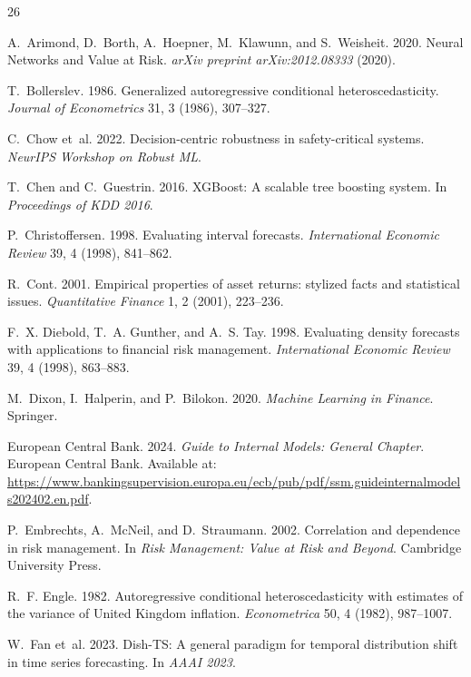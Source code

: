 \documentclass[sigconf]{acmart}
\begin{document}

\begin{thebibliography}{26}

A.~Arimond, D.~Borth, A.~Hoepner, M.~Klawunn, and S.~Weisheit. 2020. Neural Networks and Value at Risk. \textit{arXiv preprint arXiv:2012.08333} (2020).

T.~Bollerslev. 1986. Generalized autoregressive conditional heteroscedasticity.
\textit{Journal of Econometrics} 31, 3 (1986), 307--327.

C.~Chow et~al. 2022. Decision-centric robustness in safety-critical systems.
\textit{NeurIPS Workshop on Robust ML}.

T.~Chen and C.~Guestrin. 2016. XGBoost: A scalable tree boosting system.
In \textit{Proceedings of KDD 2016}.

P.~Christoffersen. 1998. Evaluating interval forecasts.
\textit{International Economic Review} 39, 4 (1998), 841--862.

R.~Cont. 2001. Empirical properties of asset returns: stylized facts and
statistical issues. \textit{Quantitative Finance} 1, 2 (2001), 223--236.

F.~X. Diebold, T.~A. Gunther, and A.~S. Tay. 1998. Evaluating density
forecasts with applications to financial risk management.
\textit{International Economic Review} 39, 4 (1998), 863--883.

M.~Dixon, I.~Halperin, and P.~Bilokon. 2020.
\textit{Machine Learning in Finance}. Springer.

European Central Bank. 2024. \textit{Guide to Internal Models: General Chapter}. European Central Bank. Available at: \url{https://www.bankingsupervision.europa.eu/ecb/pub/pdf/ssm.guideinternalmodels202402.en.pdf}.

P.~Embrechts, A.~McNeil, and D.~Straumann. 2002. Correlation and dependence
in risk management. In \textit{Risk Management: Value at Risk and Beyond}.
Cambridge University Press.

R.~F. Engle. 1982. Autoregressive conditional heteroscedasticity with
estimates of the variance of United Kingdom inflation.
\textit{Econometrica} 50, 4 (1982), 987--1007.

W.~Fan et~al. 2023. Dish-TS: A general paradigm for temporal distribution
shift in time series forecasting. In \textit{AAAI 2023}.


\end{thebibliography}
\end{document}
